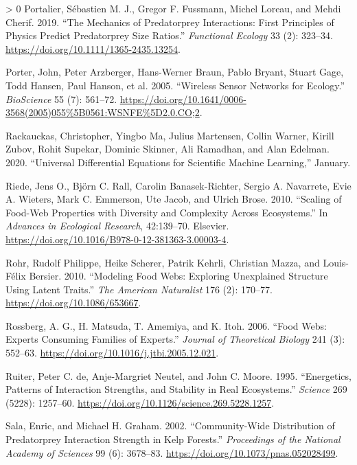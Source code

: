\documentclass[11pt]{article}
\newlength{\cslhangindent}
\newenvironment{CSLReferences}[3] %
 {%
  \setlength{\parindent}{0pt}
  \ifodd #1 \everypar{\setlength{\hangindent}{\cslhangindent}}\ignorespaces\fi
  \ifnum #2 > 0
  \setlength{\parskip}{#2\baselineskip}
  \fi
 }%
 {}
\begin{document}
\begin{CSLReferences}{1}{0}
\leavevmode\hypertarget{ref-Portalier2019MecPre}{}%
Portalier, Sébastien M. J., Gregor F. Fussmann, Michel Loreau, and Mehdi
Cherif. 2019. {``The Mechanics of Predatorprey Interactions: First
Principles of Physics Predict Predatorprey Size Ratios.''}
\emph{Functional Ecology} 33 (2): 323--34.
\url{https://doi.org/10.1111/1365-2435.13254}.

\leavevmode\hypertarget{ref-Porter2005WirSen}{}%
Porter, John, Peter Arzberger, Hans-Werner Braun, Pablo Bryant, Stuart
Gage, Todd Hansen, Paul Hanson, et al. 2005. {``Wireless Sensor Networks
for Ecology.''} \emph{BioScience} 55 (7): 561--72.
\url{https://doi.org/10.1641/0006-3568(2005)055\%5B0561:WSNFE\%5D2.0.CO;2}.

\leavevmode\hypertarget{ref-Rackauckas2020UniDif}{}%
Rackauckas, Christopher, Yingbo Ma, Julius Martensen, Collin Warner,
Kirill Zubov, Rohit Supekar, Dominic Skinner, Ali Ramadhan, and Alan
Edelman. 2020. {``Universal Differential Equations for Scientific
Machine Learning,''} January.

\leavevmode\hypertarget{ref-Riede2010ScaFoo}{}%
Riede, Jens O., Björn C. Rall, Carolin Banasek-Richter, Sergio A.
Navarrete, Evie A. Wieters, Mark C. Emmerson, Ute Jacob, and Ulrich
Brose. 2010. {``Scaling of Food-Web Properties with Diversity and
Complexity Across Ecosystems.''} In \emph{Advances in Ecological
Research}, 42:139--70. Elsevier.
\url{https://doi.org/10.1016/B978-0-12-381363-3.00003-4}.

\leavevmode\hypertarget{ref-Rohr2010ModFoo}{}%
Rohr, Rudolf Philippe, Heike Scherer, Patrik Kehrli, Christian Mazza,
and Louis-Félix Bersier. 2010. {``Modeling Food Webs: Exploring
Unexplained Structure Using Latent Traits.''} \emph{The American
Naturalist} 176 (2): 170--77. \url{https://doi.org/10.1086/653667}.

\leavevmode\hypertarget{ref-Rossberg2006FooWeb}{}%
Rossberg, A. G., H. Matsuda, T. Amemiya, and K. Itoh. 2006. {``Food
Webs: Experts Consuming Families of Experts.''} \emph{Journal of
Theoretical Biology} 241 (3): 552--63.
\url{https://doi.org/10.1016/j.jtbi.2005.12.021}.

\leavevmode\hypertarget{ref-Ruiter1995EnePat}{}%
Ruiter, Peter C. de, Anje-Margriet Neutel, and John C. Moore. 1995.
{``Energetics, Patterns of Interaction Strengths, and Stability in Real
Ecosystems.''} \emph{Science} 269 (5228): 1257--60.
\url{https://doi.org/10.1126/science.269.5228.1257}.

\leavevmode\hypertarget{ref-Sala2002ComDis}{}%
Sala, Enric, and Michael H. Graham. 2002. {``Community-Wide Distribution
of Predatorprey Interaction Strength in Kelp Forests.''}
\emph{Proceedings of the National Academy of Sciences} 99 (6): 3678--83.
\url{https://doi.org/10.1073/pnas.052028499}.


\end{CSLReferences}
\end{document}

